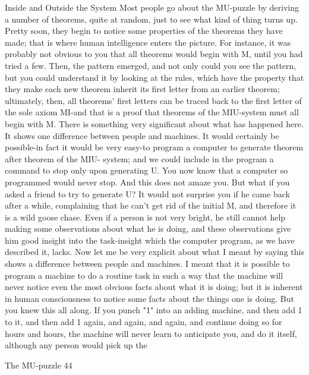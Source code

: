                            Inside and Outside the System
Most people go about the MU-puzzle by deriving a number of theorems, quite at random,
just to see what kind of thing turns up. Pretty soon, they begin to notice some properties
of the theorems they have made; that is where human intelligence enters the picture. For
instance, it was probably not obvious to you that all theorems would begin with M, until
you had tried a few. Then, the pattern emerged, and not only could you see the pattern,
but you could understand it by looking at the rules, which have the property that they
make each new theorem inherit its first letter from an earlier theorem; ultimately, then, all
theorems' first letters can be traced back to the first letter of the sole axiom MI-and that is
a proof that theorems of the MIU-system must all begin with M.
         There is something very significant about what has happened here. It shows one
difference between people and machines. It would certainly be possible-in fact it would
be very easy-to program a computer to generate theorem after theorem of the MIU-
system; and we could include in the program a command to stop only upon generating U.
You now know that a computer so programmed would never stop. And this does not
amaze you. But what if you asked a friend to try to generate U? It would not surprise you
if he came back after a while, complaining that he can't get rid of the initial M, and
therefore it is a wild goose chase. Even if a person is not very bright, he still cannot help
making some observations about what he is doing, and these observations give him good
insight into the task-insight which the computer program, as we have described it, lacks.
         Now let me be very explicit about what I meant by saying this shows a difference
between people and machines. I meant that it is possible to program a machine to do a
routine task in such a way that the machine will never notice even the most obvious facts
about what it is doing; but it is inherent in human consciousness to notice some facts
about the things one is doing. But you knew this all along. If you punch "1" into an
adding machine, and then add 1 to it, and then add 1 again, and again, and again, and
continue doing so for hours and hours, the machine will never learn to anticipate you, and
do it itself, although any person would pick up the




The MU-puzzle                                                                               44

